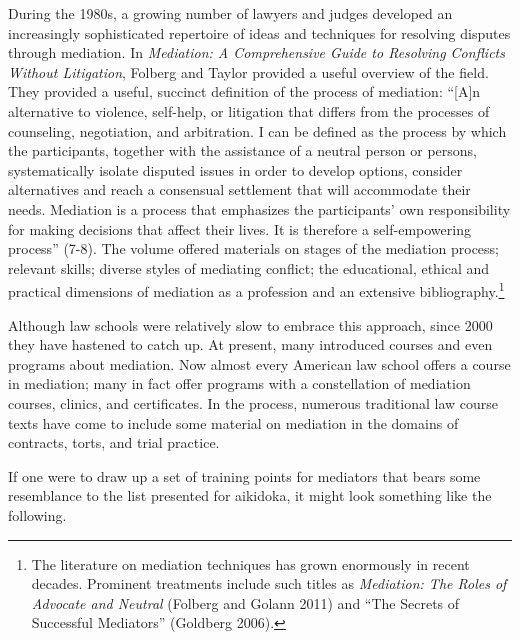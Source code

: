 During the 1980s, a growing number of lawyers and judges developed an increasingly sophisticated repertoire of ideas and techniques for resolving disputes through mediation. In \emph{Mediation: A Comprehensive Guide to Resolving Conflicts Without Litigation}, Folberg and Taylor provided a useful overview of the field. They provided a useful, succinct definition of the process of mediation: ``[A]n alternative to violence, self-help, or litigation that differs from the processes of counseling, negotiation, and arbitration. I can be defined as the process by which the participants, together with the assistance of a neutral person or persons, systematically isolate disputed issues in order to develop options, consider alternatives and reach a consensual settlement that will accommodate their needs. Mediation is a process that emphasizes the participants' own responsibility for making decisions that affect their lives. It is therefore a self-empowering process'' (7-8). The volume offered materials on stages of the mediation process; relevant skills; diverse styles of mediating conflict; the educational, ethical and practical dimensions of mediation as a profession and an extensive bibliography.\footnote{The literature on mediation techniques has grown enormously in recent decades.  Prominent treatments include such titles as \emph{Mediation: The Roles of Advocate and Neutral} (Folberg and Golann 2011) and ``The Secrets of Successful Mediators'' (Goldberg 2006).}

Although law schools were relatively slow to embrace this approach, since 2000 they have hastened to catch up. At present, many introduced courses and even programs about mediation. Now almost every American law school offers a course in mediation; many in fact offer programs with a constellation of mediation courses, clinics, and certificates. In the process, numerous traditional law course texts have come to include some material on mediation in the domains of contracts, torts, and trial practice.

If one were to draw up a set of training points for mediators that bears some resemblance to the list presented for aikidoka, it might look something like the following.

